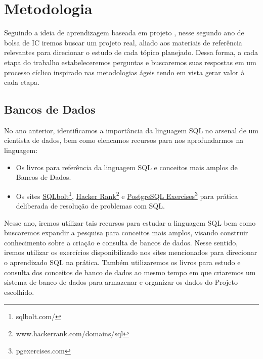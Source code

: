 \documentclass{article}
\begin{document}
\section{Metodologia}
Seguindo a ideia de aprendizagem baseada em projeto \cite{krajcik2006project}, nesse segundo ano de bolsa de IC iremos buscar um projeto real, aliado aos materiais de referência relevantes para direcionar o estudo de cada tópico planejado. 
Dessa forma, a cada etapa do trabalho estabeleceremos perguntas e buscaremos suas respostas em um processo cíclico inspirado nas metodologias ágeis \cite{beck2001manifesto} tendo em vista gerar valor à cada etapa. 

\subsection{Bancos de Dados}
No ano anterior, identificamos a importância da linguagem SQL no arsenal de um cientista de dados, bem como elencamos recursos para nos aprofundarmos na linguagem:
\begin{itemize}
    \item Os livros \cite{debarros2022practical,Silberschatz2019DBS} para referência da linguagem SQL e conceitos mais amplos de Bancos de Dados. 
    \item Os sites \href{https://sqlbolt.com/}{SQLbolt}\footnote{sqlbolt.com/}, \href{https://www.hackerrank.com/domains/sql}{Hacker Rank}\footnote{www.hackerrank.com/domains/sql} e \href{https://pgexercises.com/}{PostgreSQL Exercises}\footnote{pgexercises.com} para prática deliberada de resolução de problemas com SQL.
\end{itemize}

Nesse ano, iremos utilizar tais recursos para estudar a linguagem SQL bem como buscaremos expandir a pesquisa para conceitos mais amplos, visando construir conhecimento sobre a criação e consulta de bancos de dados. 
Nesse sentido, iremos utilizar os exercícios disponibilizado nos sites mencionados para direcionar o aprendizado SQL na prática. Também utilizaremos os livros \cite{debarros2022practical,Silberschatz2019DBS} para estudo e consulta dos conceitos de banco de dados ao mesmo tempo em que criaremos um sistema de banco de dados para armazenar e organizar os dados do Projeto escolhido. 
\end{document}
